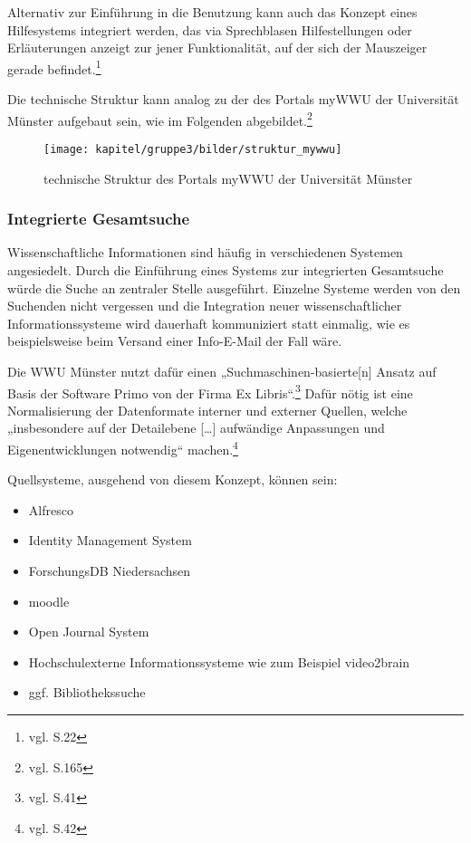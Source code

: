 Alternativ zur Einführung in die Benutzung kann auch das Konzept eines Hilfesystems integriert werden, das via Sprechblasen Hilfestellungen oder Erläuterungen anzeigt zur jener Funktionalität, auf der sich der Mauszeiger gerade befindet.\footnote{vgl. \cite{vogl_bericht_2013} S.22}

Die technische Struktur kann analog zu der des Portals myWWU der Universität Münster aufgebaut sein, wie im Folgenden abgebildet.\footnote{vgl. \cite{vogl_fortschritte_2012} S.165}
\begin{figure}[h!]
	\centering
	\texttt{[image: kapitel/gruppe3/bilder/struktur\_mywwu]}
	\caption{technische Struktur des Portals myWWU der Universität Münster}
	\label{fig_struktur_mywwu}
\end{figure}
\newpage

\subsubsection{Integrierte Gesamtsuche}
Wissenschaftliche Informationen sind häufig in verschiedenen Systemen angesiedelt. Durch die Einführung eines Systems zur integrierten Gesamtsuche würde die Suche an zentraler Stelle ausgeführt. Einzelne Systeme werden von den Suchenden nicht vergessen und die Integration neuer wissenschaftlicher Informationssysteme wird dauerhaft kommuniziert statt einmalig, wie es beispielsweise beim 
Versand einer Info-E-Mail der Fall wäre.

Die WWU Münster nutzt dafür einen „Suchmaschinen-basierte[n] Ansatz auf Basis der Software Primo von der Firma Ex Libris“.\footnote{vgl. \cite{vogl_fortschritte_2012} S.41} Dafür nötig ist eine Normalisierung der Datenformate interner und externer Quellen, welche „insbesondere auf der Detailebene […] aufwändige Anpassungen und Eigenentwicklungen notwendig“ machen.\footnote{vgl. \cite{vogl_fortschritte_2012} S.42} 

Quellsysteme, ausgehend von diesem Konzept, können sein:
\begin{itemize}
	\item Alfresco
	\item Identity Management System
	\item ForschungsDB Niedersachsen
	\item moodle
	\item Open Journal System
	\item Hochschulexterne Informationssysteme wie zum Beispiel video2brain
	\item ggf. Bibliothekssuche
\end{itemize}

